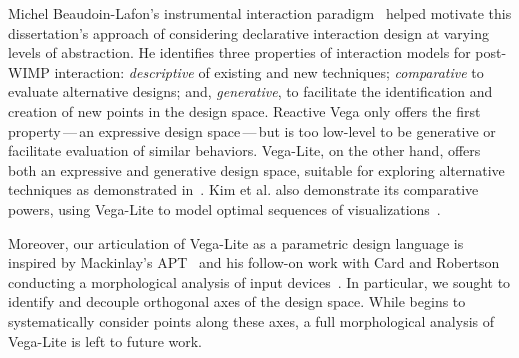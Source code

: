 Michel Beaudoin-Lafon's instrumental interaction
paradigm~\cite{beaudouin:instrumental} helped motivate this dissertation's
approach of considering declarative interaction design at varying levels of
abstraction. He identifies three properties of interaction models for post-WIMP
interaction: \emph{descriptive} of existing and new techniques;
\emph{comparative} to evaluate alternative designs; and, \emph{generative}, to
facilitate the identification and creation of new points in the design space.
Reactive Vega only offers the first property\,---\,an expressive design
space\,---\,but is too low-level to be generative or facilitate evaluation of
similar behaviors. Vega-Lite, on the other hand, offers both an expressive and
generative design space, suitable for exploring alternative techniques as
demonstrated in~. Kim et al. also demonstrate its
comparative powers, using Vega-Lite to model optimal sequences of
visualizations~\cite{kim:graphscape}.

Moreover, our articulation of Vega-Lite as a parametric design language is
inspired by Mackinlay's APT~\cite{mackinlay:apt} and his follow-on work with
Card and Robertson conducting a morphological analysis of input
devices~\cite{card:morphological}. In particular, we sought to identify and
decouple orthogonal axes of the design space. While 
begins to systematically consider points along these axes, a full morphological
analysis of Vega-Lite is left to future work.